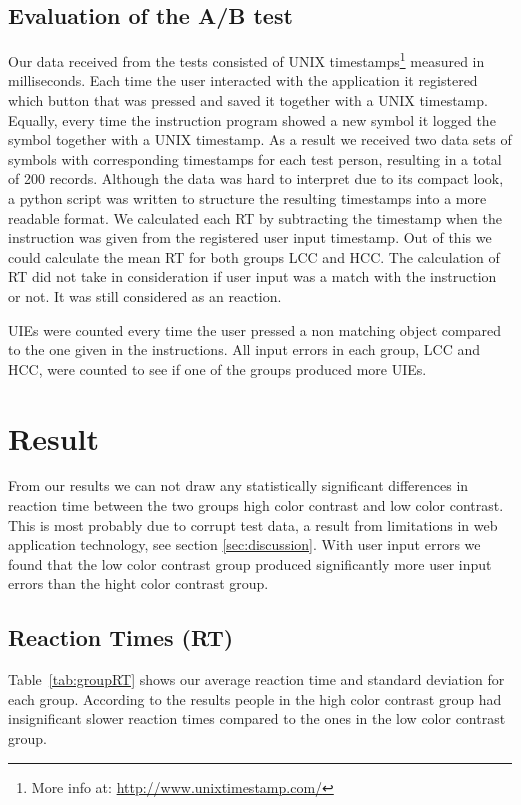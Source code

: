 \documentclass[runningheads,a4paper]{llncs}
\begin{document}
\subsection{Evaluation of the A/B test}
Our data received from the tests consisted of UNIX timestamps\footnote{More info at: \url{http://www.unixtimestamp.com/}} measured in milliseconds. Each time the user interacted with the application it registered which button that was pressed and saved it together with a UNIX timestamp. Equally, every time the instruction program showed a new symbol it logged the symbol together with a UNIX timestamp. As a result we received two data sets of symbols with corresponding timestamps for each test person, resulting in a total of 200 records. Although the data was hard to interpret due to its compact look, a python script was written to structure the resulting timestamps into a more readable format. We calculated each RT by subtracting the timestamp when the instruction was given from the registered user input timestamp. Out of this we could calculate the mean RT for both groups LCC and HCC. The calculation of RT did not take in consideration if user input was a match with the instruction or not. It was still considered as an reaction.

UIEs were counted every time the user pressed a non matching object compared to the one given in the instructions. All input errors in each group, LCC and HCC, were counted to see if one of the groups produced more UIEs.

\section{Result}
From our results we can not draw any statistically significant differences in reaction time between the two groups high color contrast and low color contrast. This is most probably due to corrupt test data, a result from limitations in web application technology, see section \ref{sec:discussion}. With user input errors we found that the low color contrast group produced significantly more user input errors than the hight color contrast group.

\subsection{Reaction Times (RT)}
Table~\ref{tab:groupRT} shows our average reaction time and standard deviation for each group. According to the results people in the high color contrast group had insignificant slower reaction times compared to the ones in the low color contrast group.
\end{document}
